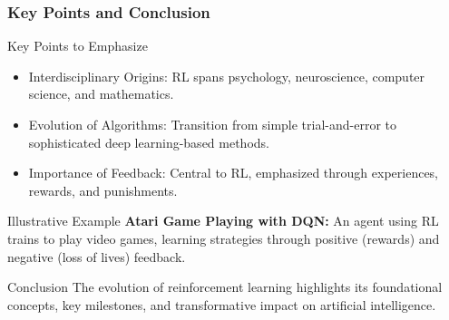 \documentclass[aspectratio=169]{beamer}
\begin{document}
\begin{frame}[fragile]
    \frametitle{Key Points and Conclusion}
    \begin{block}{Key Points to Emphasize}
        \begin{itemize}
            \item Interdisciplinary Origins: RL spans psychology, neuroscience, computer science, and mathematics.
            \item Evolution of Algorithms: Transition from simple trial-and-error to sophisticated deep learning-based methods.
            \item Importance of Feedback: Central to RL, emphasized through experiences, rewards, and punishments.
        \end{itemize}
    \end{block}

    \begin{block}{Illustrative Example}
        \textbf{Atari Game Playing with DQN:} 
        An agent using RL trains to play video games, learning strategies through positive (rewards) and negative (loss of lives) feedback.
    \end{block}

    \begin{block}{Conclusion}
        The evolution of reinforcement learning highlights its foundational concepts, key milestones, and transformative impact on artificial intelligence. 
    \end{block}
\end{frame}
\end{document}
